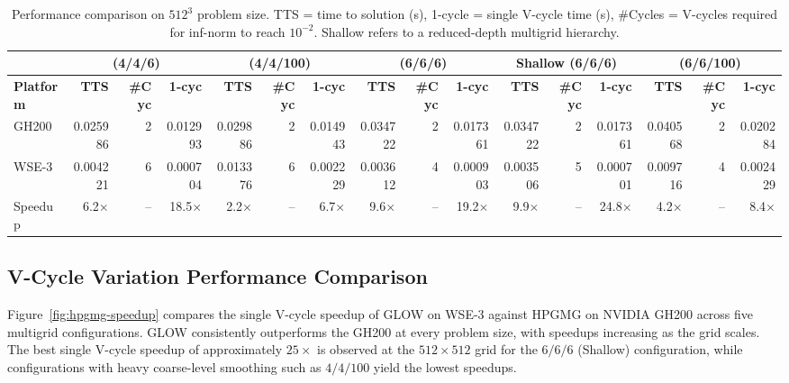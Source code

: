 \documentclass[conference]{IEEEtran}
\begin{document}
\begin{table}[t]
    \caption{Performance comparison on $512^3$ problem size. TTS = time to solution (s), 1-cycle = single V-cycle time (s), \#Cycles = V-cycles required for inf-norm to reach $10^{-2}$. Shallow refers to a reduced-depth multigrid hierarchy.}
    \label{tab:platform_comparison}
    \centering
    \footnotesize
    \setlength{\tabcolsep}{3pt}
    \begin{tabular}{|l||r|r|r||r|r|r||r|r|r||r|r|r||r|r|r|} \hline
        & \multicolumn{3}{c||}{\textbf{(4/4/6)}}
        & \multicolumn{3}{c||}{\textbf{(4/4/100)}}
        & \multicolumn{3}{c||}{\textbf{(6/6/6)}}
        & \multicolumn{3}{c||}{\textbf{Shallow (6/6/6)}}
        & \multicolumn{3}{c|}{\textbf{(6/6/100)}} \\ \hline
        \textbf{Platform} & \textbf{TTS} & \textbf{\#Cyc} & \textbf{1-cyc}
                          & \textbf{TTS} & \textbf{\#Cyc} & \textbf{1-cyc}
                          & \textbf{TTS} & \textbf{\#Cyc} & \textbf{1-cyc}
                          & \textbf{TTS} & \textbf{\#Cyc} & \textbf{1-cyc}
                          & \textbf{TTS} & \textbf{\#Cyc} & \textbf{1-cyc} \\ \hline \hline
        GH200   & 0.025986 & 2 & 0.012993
                & 0.029886 & 2 & 0.014943
                & 0.034722 & 2 & 0.017361
                & 0.034722 & 2 & 0.017361
                & 0.040568 & 2 & 0.020284 \\ \hline
        WSE-3   & 0.004221 & 6 & 0.000704
                & 0.013376 & 6 & 0.002229
                & 0.003612 & 4 & 0.000903
                & 0.003506 & 5 & 0.000701
                & 0.009716 & 4 & 0.002429 \\ \hline \hline
        Speedup & 6.2$\times$ & -- & 18.5$\times$
                & 2.2$\times$ & -- &  6.7$\times$
                & 9.6$\times$ & -- & 19.2$\times$
                & 9.9$\times$ & -- & 24.8$\times$
                & 4.2$\times$ & -- &  8.4$\times$ \\ \hline
    \end{tabular}
\end{table}

        \subsection{V-Cycle Variation Performance Comparison}
            Figure~\ref{fig:hpgmg-speedup} compares the single V-cycle speedup of GLOW on WSE-3 against HPGMG on NVIDIA GH200 across five multigrid configurations. GLOW consistently outperforms the GH200 at every problem size, with speedups increasing as the grid scales. The best single V-cycle speedup of approximately $25\times$ is observed at the $512{\times}512$ grid for the $6/6/6$ (Shallow) configuration, while configurations with heavy coarse-level smoothing such as $4/4/100$ yield the lowest speedups.
\end{document}
